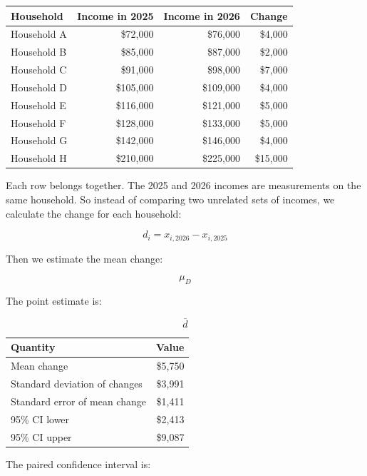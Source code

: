 \documentclass[
  letterpaper,
  DIV=11,
  numbers=noendperiod]{scrreprt}
\begin{document}
\begin{table}
\fontsize{12.0pt}{14.0pt}\selectfont
\begin{tabular*}{\linewidth}{@{\extracolsep{\fill}}lrrr}
\toprule
Household & Income in 2025 & Income in 2026 & Change \\ 
\midrule\addlinespace[2.5pt]
Household A & \$72,000 & \$76,000 & \$4,000 \\ 
Household B & \$85,000 & \$87,000 & \$2,000 \\ 
Household C & \$91,000 & \$98,000 & \$7,000 \\ 
Household D & \$105,000 & \$109,000 & \$4,000 \\ 
Household E & \$116,000 & \$121,000 & \$5,000 \\ 
Household F & \$128,000 & \$133,000 & \$5,000 \\ 
Household G & \$142,000 & \$146,000 & \$4,000 \\ 
Household H & \$210,000 & \$225,000 & \$15,000 \\ 
\bottomrule
\end{tabular*}
\end{table}

Each row belongs together. The 2025 and 2026 incomes are measurements on
the same household. So instead of comparing two unrelated sets of
incomes, we calculate the change for each household:

\[
d_i = x_{i,\text{2026}} - x_{i,\text{2025}}
\]

Then we estimate the mean change:

\[
\mu_D
\]

The point estimate is:

\[
\bar{d}
\]

\begin{table}
\fontsize{12.0pt}{14.0pt}\selectfont
\begin{tabular*}{\linewidth}{@{\extracolsep{\fill}}lr}
\toprule
Quantity & Value \\ 
\midrule\addlinespace[2.5pt]
Mean change & \$5,750 \\ 
Standard deviation of changes & \$3,991 \\ 
Standard error of mean change & \$1,411 \\ 
95\% CI lower & \$2,413 \\ 
95\% CI upper & \$9,087 \\ 
\bottomrule
\end{tabular*}
\end{table}

The paired confidence interval is:
\end{document}
